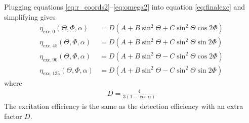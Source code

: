 \documentclass[11pt]{article}
\begin{document}
Plugging equations \ref{eq:r_coords2}--\ref{eq:omega2} into equation
\ref{eq:finalexc} and simplifying gives
\begin{subequations}
\begin{align}
  \eta_{\text{exc},0}(\Theta, \Phi, \alpha) &= D(A + B\sin^{2}{\Theta} + C\sin^{2}{\Theta} \cos{2 \Phi})\\
  \eta_{\text{exc},45}(\Theta, \Phi, \alpha) &= D(A + B\sin^{2}{\Theta} + C\sin^{2}{\Theta} \sin{2 \Phi})\\
  \eta_{\text{exc},90}(\Theta, \Phi, \alpha) &= D(A + B\sin^{2}{\Theta} - C\sin^{2}{\Theta} \cos{2 \Phi})\\
  \eta_{\text{exc},135}(\Theta, \Phi, \alpha) &= D(A + B\sin^{2}{\Theta} - C\sin^{2}{\Theta} \sin{2 \Phi})
\end{align}\label{eq:int2}
\end{subequations}
where
\vspace{-1em}
\begin{align}
  D = \frac{4}{3(1 - \cos\alpha)}
\end{align}\label{eq:coeff2}%
The excitation efficiency is the same as the detection efficiency with an extra
factor $D$.
\end{document}
